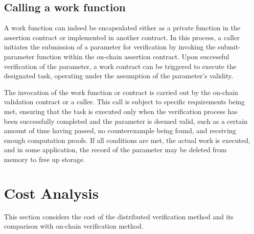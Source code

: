\documentclass[runningheads]{llncs}
\begin{document}
\subsection{Calling a work function}
A work function can indeed be encapsulated either as a private function in the assertion contract or implemented in another contract. In this process, a caller initiates the submission of a parameter for verification by invoking the submit-parameter function within the on-chain assertion contract. Upon successful verification of the parameter, a work contract can be triggered to execute the designated task, operating under the assumption of the parameter's validity.

The invocation of the work function or contract is carried out by the on-chain validation contract or a caller. This call is subject to specific requirements being met, ensuring that the task is executed only when the verification process has been successfully completed and the parameter is deemed valid, such as a certain amount of time having passed, no counterexample being found, and receiving enough computation proofs. If all conditions are met, the actual work is executed, and in some application, the record of the parameter may be deleted from memory to free up storage.




 
\section{Cost Analysis}
This section considers the cost of the distributed verification method and its comparison with on-chain verification method.
\end{document}
